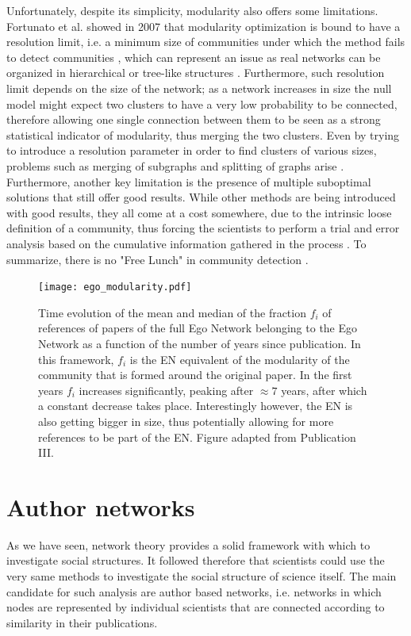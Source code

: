 Unfortunately, despite its simplicity, modularity also offers some limitations. Fortunato et al. showed in 2007 that modularity optimization is bound to have a resolution limit, i.e. a minimum size
of communities under which the method fails to detect communities \cite{Fortunato02012007}, which can represent an issue as real networks can be organized 
in hierarchical or tree-like structures  \cite{10.1371/journal.pone.0011976}. Furthermore, such resolution limit depends on the size of the network; as a network increases in size
the null model might expect two clusters to have a very low probability to be connected, therefore allowing one single connection between them to be seen as a strong
statistical indicator of modularity, thus merging the two clusters.
Even by trying to introduce a resolution parameter in order to find clusters of various sizes, problems such as merging of subgraphs and splitting
of graphs arise \cite{PhysRevE.84.066122}. Furthermore, another key limitation is the presence of multiple suboptimal solutions \cite{PhysRevE.81.046106} that still offer good results. While other methods are being introduced
with good results, they all come at a cost somewhere, due to the intrinsic loose definition of a community, thus forcing the scientists to perform a trial and error analysis based on the cumulative 
information gathered in the process \cite{Fortunato20161}. To summarize, there is no "Free Lunch" in community detection \cite{Peel2017}.
    
 \begin{figure}[h]
\centering
\texttt{[image: ego\_modularity.pdf]}%
\caption{Time evolution of the mean and median of the fraction $f_{i}$ of references of papers of the full Ego Network belonging to the Ego Network
as a function of the number of years since publication. In this framework, $f_{i}$ is the EN equivalent of the modularity of the community that is formed around the original paper. 
In the first years $f_{i}$ increases significantly, peaking after $ \approx 7$ years, after which a constant decrease takes place. Interestingly
however, the EN is also getting bigger in size, thus potentially allowing for more references to be part of the EN. Figure adapted from Publication III.}
\label{fig:ego_modularity}
\end{figure}

\section{Author networks}
As we have seen, network theory provides a solid framework with which to investigate social structures. It followed therefore that scientists could use the very same methods to investigate the social structure
of science itself. The main candidate for such analysis are author based networks, i.e. networks in which nodes are represented by individual scientists that are connected according to similarity in their publications.

